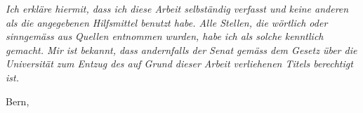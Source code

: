 
\vspace*{0cm}
\vfill
\noindent\parbox[b][0.5\textheight]{\textwidth}
{
		\vfill
		\noindent\normalsize\mdseries\itshape
Ich erkläre hiermit, dass ich diese Arbeit selbständig verfasst und keine anderen als die angegebenen Hilfsmittel benutzt habe. Alle Stellen, die wörtlich oder sinngemäss aus Quellen entnommen wurden, habe ich als solche kenntlich gemacht. Mir ist bekannt, dass andernfalls der Senat gemäss dem Gesetz über die Universität zum Entzug des auf Grund dieser Arbeit verliehenen Titels berechtigt ist.\par
		\vspace{2cm}
		\noindent\normalsize\normalfont
		{
			Bern, \thedate\par
		}\par
		\vspace{2cm}
		\noindent\normalsize\normalfont
		{
			\theauthor\par
		}\par
}\par